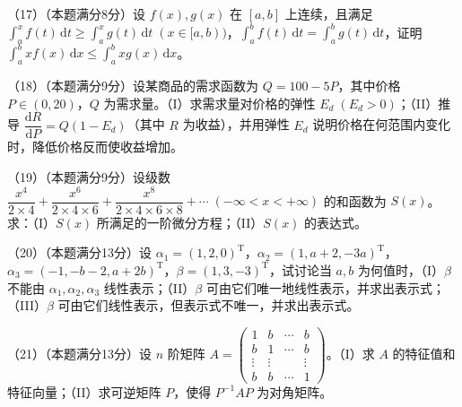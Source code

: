 \documentclass[UTF8,12pt]{ctexart}
\begin{document}
（17）（本题满分8分）设 \(\displaystyle f(x),\allowbreak g(x)\) 在 \(\displaystyle [a,\allowbreak b]\) 上连续，且满足 \(\displaystyle \int_a^xf(t)\,\mathrm dt\ge\displaystyle \int_a^xg(t)\,\mathrm dt\; (x\in[a,\allowbreak b))\)，\(\displaystyle \int_a^bf(t)\,\mathrm dt=\displaystyle \int_a^bg(t)\,\mathrm dt\)，证明 \(\displaystyle \int_a^bxf(x)\,\mathrm dx\le\displaystyle \int_a^bxg(x)\,\mathrm dx\)。


（18）（本题满分9分）设某商品的需求函数为 \(\displaystyle Q=100-5P\)，其中价格 \(\displaystyle P\in(0,\allowbreak 20)\)，\(\displaystyle Q\) 为需求量。（I）求需求量对价格的弹性 \(\displaystyle E_d\;(E_d>0)\)；（II）推导 \(\displaystyle \dfrac{\displaystyle \mathrm dR}{\displaystyle \mathrm dP}=Q(1-E_d)\)（其中 \(\displaystyle R\) 为收益），并用弹性 \(\displaystyle E_d\) 说明价格在何范围内变化时，降低价格反而使收益增加。


（19）（本题满分9分）设级数 \(\displaystyle \dfrac{\displaystyle x^4}{\displaystyle 2\times4}+\dfrac{\displaystyle x^6}{\displaystyle 2\times4\times6}+\dfrac{\displaystyle x^8}{\displaystyle 2\times4\times6\times8}+\cdots\;(-\infty<x<+\infty)\) 的和函数为 \(\displaystyle S(x)\)。求：（I）\(\displaystyle S(x)\) 所满足的一阶微分方程；（II）\(\displaystyle S(x)\) 的表达式。


（20）（本题满分13分）设 \(\displaystyle \alpha_1=(1,\allowbreak 2,\allowbreak 0)^{\mathrm T}\)，\(\displaystyle \alpha_2=(1,\allowbreak a+2,\allowbreak -3a)^{\mathrm T}\)，\(\displaystyle \alpha_3=(-1,\allowbreak -b-2,\allowbreak a+2b)^{\mathrm T}\)，\(\displaystyle \beta=(1,\allowbreak 3,\allowbreak -3)^{\mathrm T}\)，试讨论当 \(\displaystyle a,\allowbreak b\) 为何值时，（I）\(\displaystyle \beta\) 不能由 \(\displaystyle \alpha_1,\allowbreak \alpha_2,\allowbreak \alpha_3\) 线性表示；（II）\(\displaystyle \beta\) 可由它们唯一地线性表示，并求出表示式；（III）\(\displaystyle \beta\) 可由它们线性表示，但表示式不唯一，并求出表示式。


（21）（本题满分13分）设 \(\displaystyle n\) 阶矩阵 \(\displaystyle A=\begin{pmatrix}1&b&\cdots&b\\b&1&\cdots&b\\\vdots&\vdots&&\vdots\\b&b&\cdots&1\end{pmatrix}\)。（I）求 \(\displaystyle A\) 的特征值和特征向量；（II）求可逆矩阵 \(\displaystyle P\)，使得 \(\displaystyle P^{-1}AP\) 为对角矩阵。
\end{document}
